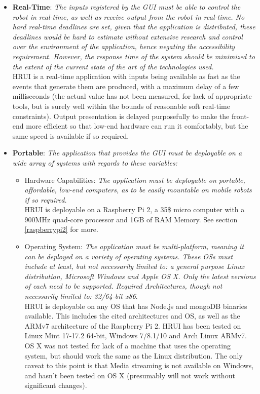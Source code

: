\begin{itemize}
	\item \textbf{Real-Time}: \textit{The inputs registered by the GUI must be able to control the robot in real-time, as 
	well as receive output from the robot in real-time. No hard real-time deadlines are set, given that the application is 
	distributed, these deadlines would be hard to estimate without extensive research and control over the environment of 
	the application, hence negating the accessibility requirement. However, the response time of the system should be 
	minimized to the extent of the current state of the art of the technologies used.}\\

	HRUI is a real-time application with inputs being available as fast as the events that generate them are produced, with 
	a maximum delay of a few milliseconds (the actual value has not been measured, for lack of appropriate tools, but is 
	surely well within the bounds of reasonable soft real-time constraints). Output presentation is delayed purposefully to 
	make the front-end more efficient so that low-end hardware can run it comfortably, but the same speed is available if 
	so required.

	\item \textbf{Portable}: \textit{The application that provides the GUI must be deployable on a wide array of systems 
	with regards to these variables:}\\
		\begin{itemize}
			\item Hardware Capabilities: \textit{The application must be deployable on portable, affordable, low-end 
			computers, as to be easily mountable on mobile robots if so required.}\\

			HRUI is deployable on a Raspberry Pi 2, a 35\$ micro computer with a 900MHz quad-core processor and 1GB of RAM 
			Memory. See section \ref{raspberrypi2} for more.


			\item Operating System: \textit{The application must be multi-platform, meaning it can be deployed on a variety 
			of operating systems. These OSs must include at least, but not necessarily limited to: a general purpose Linux 
			distribution, Microsoft Windows and Apple OS X. Only the latest versions of each need to be supported. Required 
			Architectures, though not necessarily limited to: 32/64-bit x86}.\\

			HRUI is deployable on any OS that has Node.js and mongoDB binaries available. This includes the cited 
			architectures and OS, as well as the ARMv7 architecture of the Raspberry Pi 2. HRUI has been tested on Linux 
			Mint 17-17.2 64-bit, Windows 7/8.1/10 and Arch Linux ARMv7. OS X was not tested for lack of a machine that uses 
			the operating system, but should work the same as the Linux distribution. The only caveat to this point is that 
			Media streaming is not available on Windows, and hasn't been tested on OS X (presumably will not work without 
			significant changes).


\end{itemize}
\end{itemize}
